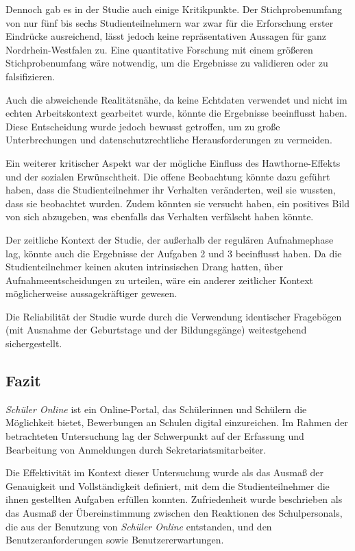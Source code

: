 Dennoch gab es in der Studie auch einige Kritikpunkte. Der Stichprobenumfang von nur fünf bis sechs Studienteilnehmern war zwar für die Erforschung erster Eindrücke ausreichend, lässt jedoch keine repräsentativen Aussagen für ganz Nordrhein-Westfalen zu. Eine quantitative Forschung mit einem größeren Stichprobenumfang wäre notwendig, um die Ergebnisse zu validieren oder zu falsifizieren.

Auch die abweichende Realitätsnähe, da keine Echtdaten verwendet und nicht im echten Arbeitskontext gearbeitet wurde, könnte die Ergebnisse beeinflusst haben. Diese Entscheidung wurde jedoch bewusst getroffen, um zu große Unterbrechungen und datenschutzrechtliche Herausforderungen zu vermeiden.

Ein weiterer kritischer Aspekt war der mögliche Einfluss des Hawthorne-Effekts und der sozialen Erwünschtheit. Die offene Beobachtung könnte dazu geführt haben, dass die Studienteilnehmer ihr Verhalten veränderten, weil sie wussten, dass sie beobachtet wurden. Zudem könnten sie versucht haben, ein positives Bild von sich abzugeben, was ebenfalls das Verhalten verfälscht haben könnte.

Der zeitliche Kontext der Studie, der außerhalb der regulären Aufnahmephase lag, könnte auch die Ergebnisse der Aufgaben 2 und 3 beeinflusst haben. Da die Studienteilnehmer keinen akuten intrinsischen Drang hatten, über Aufnahmeentscheidungen zu urteilen, wäre ein anderer zeitlicher Kontext möglicherweise aussagekräftiger gewesen.

Die Reliabilität der Studie wurde durch die Verwendung identischer Fragebögen (mit Ausnahme der Geburtstage und der Bildungsgänge) weitestgehend sichergestellt.

\subsection{Fazit}

\textit{Schüler Online} ist ein Online-Portal, das Schülerinnen und Schülern die Möglichkeit bietet, Bewerbungen an Schulen digital einzureichen. Im Rahmen der betrachteten Untersuchung lag der Schwerpunkt auf der Erfassung und Bearbeitung von Anmeldungen durch Sekretariatsmitarbeiter.

Die Effektivität im Kontext dieser Untersuchung wurde als das Ausmaß der Genauigkeit und Vollständigkeit definiert, mit dem die Studienteilnehmer die ihnen gestellten Aufgaben erfüllen konnten. Zufriedenheit wurde beschrieben als das Ausmaß der Übereinstimmung zwischen den Reaktionen des Schulpersonals, die aus der Benutzung von \textit{Schüler Online} entstanden, und den Benutzeranforderungen sowie Benutzererwartungen.

